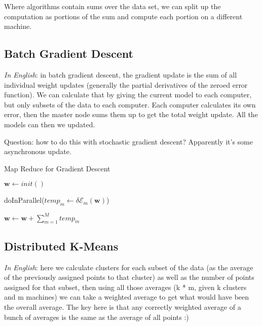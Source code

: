 \documentclass[a4paper]{article}
\begin{document}
	Where algorithms contain sums over the data set, we can split up the computation as portions of the sum and compute each portion on a different machine. \\
	
	\subsection{Batch Gradient Descent}
	
	\textit{In English}: in batch gradient descent, the gradient update is the sum of all individual weight updates (generally the partial derivatives of the zeroed error function). We can calculate that by giving the current model to each computer, but only subsets of the data to each computer. Each computer calculates its own error, then the master node sums them up to get the total weight update. All the models can then we updated. 
	
	Question: how to do this with stochastic gradient descent? Apparently it's some asynchronous update.
	
	\begin{algorithm}
		\caption{Map Reduce for Gradient Descent}
			\begin{algorithmic}[5]
				  
				
				\State $\mathbf{w} \gets init()$ 
				
					
					\State doInParallel($temp_m \gets \delta \mathcal{E}_m(\mathbf{w})$)
					
					\State $\mathbf{w} \gets \mathbf{w} + \sum_{m=1}^M temp_m$
				
				\EndWhile
				
				\EndProcedure
			\end{algorithmic}
		\end{algorithm}
		
	
	\subsection{Distributed K-Means}
	
	\textit{In English}: here we calculate clusters for each subset of the data (as the average of the previously assigned points to that cluster) as well as the number of points assigned for that subset, then using all those averages (k * m, given k clusters and m machines) we can take a weighted average to get what would have been the overall average. The key here is that any correctly weighted average of a bunch of averages is the same as the average of all points :)
	
\end{document}
